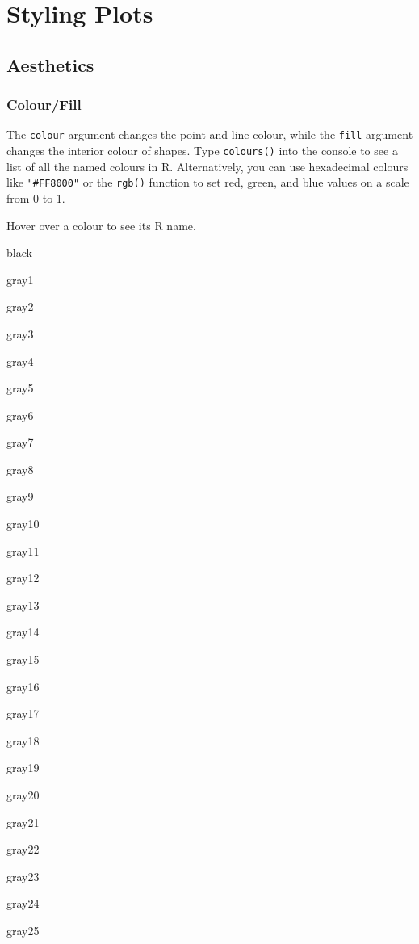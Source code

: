 \documentclass[
  oneside]{book}
\begin{document}
\hypertarget{plotstyle}{%
\chapter{Styling Plots}\label{plotstyle}}

\hypertarget{aesthetics}{%
\section{Aesthetics}\label{aesthetics}}

\hypertarget{colourfill}{%
\subsection{Colour/Fill}\label{colourfill}}

The \texttt{colour} argument changes the point and line colour, while the \texttt{fill} argument changes the interior colour of shapes. Type \texttt{colours()} into the console to see a list of all the named colours in R. Alternatively, you can use hexadecimal colours like \texttt{"\#FF8000"} or the \texttt{rgb()} function to set red, green, and blue values on a scale from 0 to 1.

Hover over a colour to see its R name.

{black}

{gray1}

{gray2}

{gray3}

{gray4}

{gray5}

{gray6}

{gray7}

{gray8}

{gray9}

{gray10}

{gray11}

{gray12}

{gray13}

{gray14}

{gray15}

{gray16}

{gray17}

{gray18}

{gray19}

{gray20}

{gray21}

{gray22}

{gray23}

{gray24}

{gray25}
\end{document}
